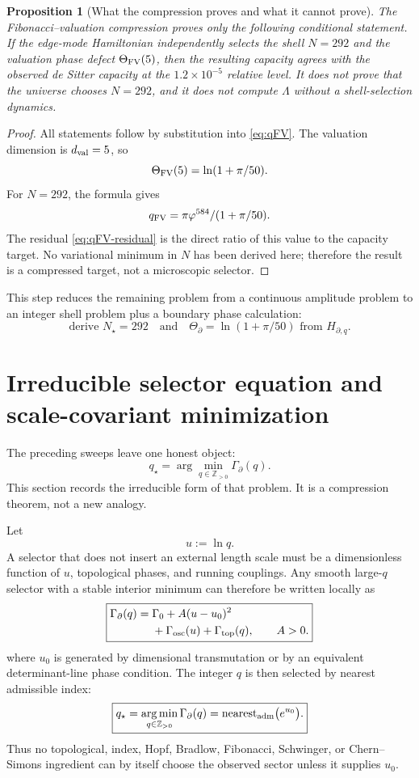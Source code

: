 \documentclass[aps,prd,reprint,nofootinbib,superscriptaddress,floatfix]{revtex4-2}
\numberwithin{equation}{section}
\theoremstyle{definition}
\theoremstyle{plain}
\newtheorem{proposition}{Proposition}[section]
\begin{document}
\begin{proposition}[What the compression proves and what it cannot prove]
The Fibonacci--valuation compression proves only the following conditional statement.  If the edge-mode Hamiltonian independently selects the shell \(N=292\) and the valuation phase defect \(\Theta_{\rm FV}(5)\), then the resulting capacity agrees with the observed de Sitter capacity at the \(1.2\times10^{-5}\) relative level.  It does not prove that the universe chooses \(N=292\), and it does not compute \(\Lambda\) without a shell-selection dynamics.
\end{proposition}

\begin{proof}
All statements follow by substitution into \eqref{eq:qFV}.  The valuation dimension is \(d_{\rm val}=5\), so
\[
\Theta_{\rm FV}(5)=\ln(1+\pi/50).
\]
For \(N=292\), the formula gives
\[
q_{\rm FV}=\pi\varphi^{584}/(1+\pi/50).
\]
The residual \eqref{eq:qFV-residual} is the direct ratio of this value to the capacity target.  No variational minimum in \(N\) has been derived here; therefore the result is a compressed target, not a microscopic selector.
\end{proof}

This step reduces the remaining problem from a continuous amplitude problem to an integer shell problem plus a boundary phase calculation:
\begin{equation}
\boxed{
\text{derive }N_\star=292
\quad\text{and}\quad
\Theta_\partial=\ln(1+\pi/50)
\text{ from }H_{\partial,q}.
}
\end{equation}


\section{Irreducible selector equation and scale-covariant minimization}

The preceding sweeps leave one honest object:
\[
q_\star=\arg\min_{q\in\mathbb Z_{>0}}\Gamma_\partial(q).
\]
This section records the irreducible form of that problem.  It is a
compression theorem, not a new analogy.

Let
\[
u:=\ln q.
\]
A selector that does not insert an external length scale must be a
dimensionless function of \(u\), topological phases, and running
couplings.  Any smooth large-\(q\) selector with a stable interior
minimum can therefore be written locally as
\begin{equation}
\boxed{
\begin{aligned}
\Gamma_\partial(q)
={}&
\Gamma_0+A(u-u_0)^2\\
&+\Gamma_{\rm osc}(u)+\Gamma_{\rm top}(q),
\qquad A>0 .
\end{aligned}}
\end{equation}
where \(u_0\) is generated by dimensional transmutation or by an
equivalent determinant-line phase condition.  The integer \(q\) is then
selected by nearest admissible index:
\[
\boxed{
q_\star=
\operatorname*{arg\,min}_{q\in\mathbb Z_{>0}}
\Gamma_\partial(q)
=
\operatorname{nearest}_{\rm adm}\bigl(e^{u_0}\bigr).
}
\]
Thus no topological, index, Hopf, Bradlow, Fibonacci, Schwinger, or
Chern--Simons ingredient can by itself choose the observed sector unless
it supplies \(u_0\).
\end{document}
